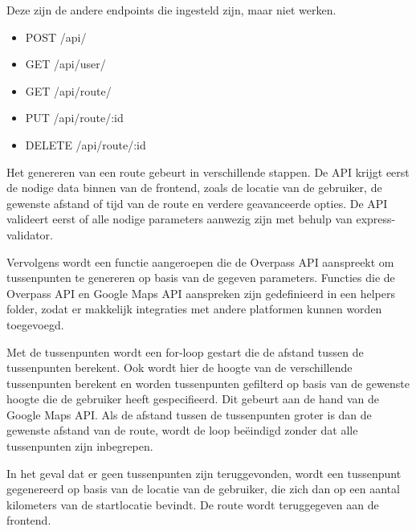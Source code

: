     \vspace{1cm}


    Deze zijn de andere endpoints die ingesteld zijn, maar niet werken.
    \begin{itemize}
        \item POST /api/
        \item GET /api/user/
        \item GET /api/route/
        \item PUT /api/route/:id
        \item DELETE /api/route/:id
    \end{itemize}

    \vspace{1cm}

    
    Het genereren van een route gebeurt in verschillende stappen. 
    De API krijgt eerst de nodige data binnen van de frontend, zoals de locatie van de gebruiker, de gewenste afstand of tijd van de route en verdere geavanceerde opties. 
    De API valideert eerst of alle nodige parameters aanwezig zijn met behulp van express-validator. 

    \vspace{1cm}

    Vervolgens wordt een functie aangeroepen die de Overpass API aanspreekt om tussenpunten te genereren op basis van de gegeven parameters. 
    Functies die de Overpass API en Google Maps API aanspreken zijn gedefinieerd in een helpers folder, zodat er makkelijk integraties met andere platformen kunnen worden toegevoegd. 

    \vspace{1cm}

    Met de tussenpunten wordt een for-loop gestart die de afstand tussen de tussenpunten berekent. Ook wordt hier de hoogte van de verschillende tussenpunten berekent en worden tussenpunten gefilterd 
    op basis van de gewenste hoogte die de gebruiker heeft gespecifieerd. Dit gebeurt aan de hand van de Google Maps API.
    Als de afstand tussen de tussenpunten groter is dan de gewenste afstand van de route,
    wordt de loop beëindigd zonder dat alle tussenpunten zijn inbegrepen. 

    \vspace{1cm}

    In het geval dat er geen tussenpunten zijn teruggevonden, wordt een tussenpunt gegenereerd op basis van de locatie van de gebruiker, die zich dan op een aantal kilometers van de startlocatie bevindt. 
    De route wordt teruggegeven aan de frontend.


